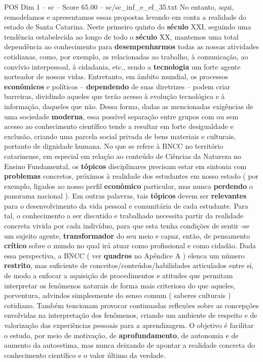 \begin{textsample}{POS Dim 1 – sc – Score 65.00 – sc/sc\_inf\_e\_ef\_35.txt}
No entanto, aqui, remodelamos e apresentamos essas propostas levando em conta a realidade do estado de Santa Catarina.
Neste primeiro quinto do \textbf{século} XXI, seguindo uma tendência estabelecida ao longo de todo o \textbf{século} XX, mantemos uma total dependência ao conhecimento para \textbf{desempenharmos} todas as nossas atividades cotidianas, como, por exemplo, as relacionadas ao trabalho, à comunicação, ao convívio interpessoal, à cidadania, etc., sendo a \textbf{tecnologia} um forte agente norteador de nossas vidas.
Entretanto, em âmbito mundial, os processos \textbf{econômicos} e políticos – \textbf{dependendo} de suas diretrizes – podem criar barreiras, dividindo aqueles que terão acesso à evolução tecnológica e à informação, daqueles que não.
Dessa forma, dadas as mencionadas exigências de uma sociedade \textbf{moderna}, essa possível separação entre grupos com ou sem acesso ao conhecimento científico tende a resultar em forte desigualdade e exclusão, criando uma parcela social privada de bens materiais e culturais, portanto de dignidade humana.
No que se refere à BNCC no território catarinense, em especial em relação ao conteúdo de Ciências da Natureza no Ensino Fundamental, os \textbf{tópicos} disciplinares precisam estar em sintonia com \textbf{problemas} concretos, próximos à realidade dos estudantes em nosso estado ( por exemplo, ligados ao nosso perfil \textbf{econômico} particular, mas nunca \textbf{perdendo} o panorama nacional ).
Em outras palavras, tais \textbf{tópicos} devem ser \textbf{relevantes} para o desenvolvimento da vida pessoal e comunitária de cada estudante.
Para tal, o conhecimento a ser discutido e trabalhado necessita partir da realidade concreta vivida por cada indivíduo, para que esta tenha condições de sentir -se um sujeito agente, \textbf{transformador} do seu meio e capaz, então, de pensamento \textbf{crítico} sobre o mundo no qual irá atuar como profissional e como cidadão.
Dada essa perspectiva, a BNCC ( ver \textbf{quadros} no Apêndice A ) elenca um número \textbf{restrito}, mas suficiente de conceitos/conteúdos/habilidades articulados entre si, de modo a enfocar a aquisição de procedimentos e atitudes que permitam interpretar os fenômenos naturais de forma mais criteriosa do que aqueles, porventura, advindos simplesmente do senso comum ( saberes culturais ) cotidiano.
Também tencionam provocar continuadas reflexões sobre as concepções envolvidas na interpretação dos fenômenos, criando um ambiente de respeito e de valorização das experiências pessoais para a aprendizagem.
O objetivo é facilitar o estudo, por meio de motivação, de \textbf{aprofundamento}, de autonomia e de aumento da autoestima, mas nunca deixando de apontar a realidade concreta do conhecimento científico e o valor último da verdade.

\end{textsample}
